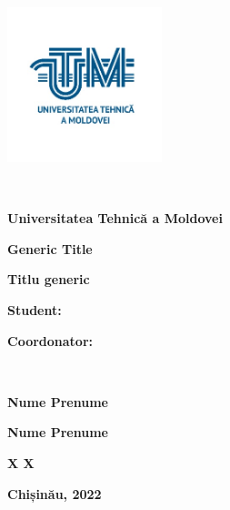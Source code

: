 \newenvironment{titlepagefont}{\fontfamily{ptm}\selectfont}{\par}

\newcommand{\thesistitlero}{Titlu generic}
\newcommand{\thesistitleen}{Generic Title}
\newcommand{\studentname}{Nume Prenume}
\newcommand{\teachername}{Nume Prenume}
\newcommand{\teachertitle}{X X}
\newcommand{\thesisyear}{2022}

\begin{titlepage}
	\begin{titlepagefont}
	    \centering
	    
	    \begin{minipage}{0.3\textwidth}
	        \includegraphics[height=4.5cm]{cover/utmlogo.jpg}
	    \end{minipage}
	    ~
	    \begin{minipage}{0.65\textwidth}
	        {\Large \bfseries Universitatea Tehnică a Moldovei}
	    \end{minipage}
    	
    	\vfill
    	
    	{\LARGE \bfseries \thesistitleen \par}
        {\LARGE \bfseries \thesistitlero \par}
    	
    	\vfill
    	
    	\hfill
        \begin{minipage}{0.2\textwidth}
            \raggedright
            {\Large \bfseries Student: \par}
            \bigskip
            {\Large \bfseries Coordonator: \par}
            {\Large \bfseries \quad \par}
	    \end{minipage}
	    ~
	    \begin{minipage}{0.5\textwidth}
	        \raggedleft
	        {\Large \bfseries \studentname \par}
	        \bigskip
	        {\Large \bfseries \teachername \par}
	        {\Large \bfseries \teachertitle \par}
	    \end{minipage}
    	
    	\vfill

    	{\Large \bfseries Chișinău, \thesisyear \par}
	
	\end{titlepagefont}
\end{titlepage}
